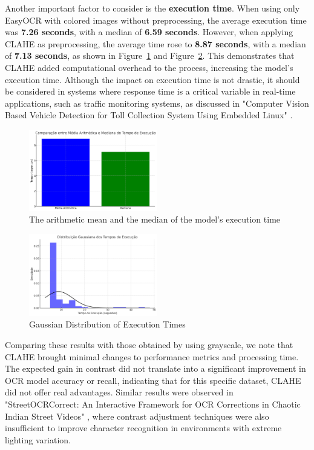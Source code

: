 \documentclass[conference]{IEEEtran}
\begin{document}
	Another important factor to consider is the \textbf{execution time}. When using only EasyOCR with colored images without preprocessing, the average execution time was \textbf{7.26 seconds}, with a median of \textbf{6.59 seconds}. However, when applying CLAHE as preprocessing, the average time rose to \textbf{8.87 seconds}, with a median of \textbf{7.13 seconds}, as shown in Figure~\ref{img11} and Figure~\ref{img12}. This demonstrates that CLAHE added computational overhead to the process, increasing the model's execution time. Although the impact on execution time is not drastic, it should be considered in systems where response time is a critical variable in real-time applications, such as traffic monitoring systems, as discussed in "Computer Vision Based Vehicle Detection for Toll Collection System Using Embedded Linux" \cite{b16}.
	
	\begin{figure}[htbp]
		\centerline{\includegraphics[width=0.5\textwidth]{img11.png}}
		\caption{The arithmetic mean and the median of the model's execution time}
		\label{img11}
	\end{figure}
	
	\begin{figure}[htbp]
		\centerline{\includegraphics[width=0.5\textwidth]{img12.png}}
		\caption{Gaussian Distribution of Execution Times}
		\label{img12}
	\end{figure}
	
	Comparing these results with those obtained by using grayscale, we note that CLAHE brought minimal changes to performance metrics and processing time. The expected gain in contrast did not translate into a significant improvement in OCR model accuracy or recall, indicating that for this specific dataset, CLAHE did not offer real advantages. Similar results were observed in "StreetOCRCorrect: An Interactive Framework for OCR Corrections in Chaotic Indian Street Videos" \cite{b13}, where contrast adjustment techniques were also insufficient to improve character recognition in environments with extreme lighting variation.
	
\end{document}
